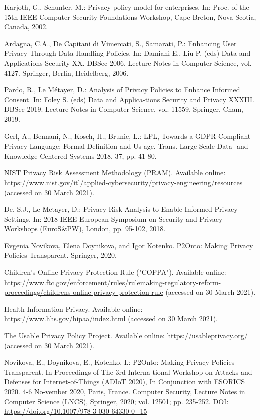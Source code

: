 \documentclass[../main]{subfiles}
\begin{document}
\begin{english}
\begin{biblenum}
     Karjoth, G., Schunter, M.: Privacy policy model for enterprises. In: Proc. of the 15th IEEE Computer Security Foundations Workshop, Cape Breton, Nova Scotia, Canada, 2002. 
    
     Ardagna, C.A., De Capitani di Vimercati, S., Samarati, P.: Enhancing User Privacy Through Data Handling Policies. In: Damiani E., Liu P. (eds) Data and Applications Security XX. DBSec 2006. Lecture Notes in Computer Science, vol. 4127. Springer, Berlin, Heidelberg, 2006. 

     Pardo, R., Le Métayer, D.: Analysis of Privacy Policies to Enhance Informed Consent. In: Foley S. (eds) Data and Applica-tions Security and Privacy XXXIII. DBSec 2019. Lecture Notes in Computer Science, vol. 11559. Springer, Cham, 2019. 

     Gerl, A., Bennani, N., Kosch, H., Brunie, L.: LPL, Towards a GDPR-Compliant Privacy Language: Formal Definition and Us-age. Trans. Large-Scale Data- and Knowledge-Centered Systems 2018, 37, pp. 41-80. 

     NIST Privacy Risk Assessment Methodology (PRAM). Available online: \url{https://www.nist.gov/itl/applied-cybersecurity/privacy-engineering/resources} (accessed on 30 March 2021).

     De, S.J., Le Metayer, D.: Privacy Risk Analysis to Enable Informed Privacy Settings. In: 2018 IEEE European Symposium on Security and Privacy Workshops (EuroS\&PW), London, pp. 95-102, 2018. 

     Evgenia Novikova, Elena Doynikova, and Igor Kotenko. P2Onto: Making Privacy Policies Transparent. Springer, 2020.

     Children's Online Privacy Protection Rule ("COPPA"). Available online: \url{https://www.ftc.gov/enforcement/rules/rulemaking-regulatory-reform-proceedings/childrens-online-privacy-protection-rule} (accessed on 30 March 2021). 

     Health Information Privacy. Available online: \url{https://www.hhs.gov/hipaa/index.html} (accessed on 30 March 2021).

     The Usable Privacy Policy Project. Available online: \url{https://usableprivacy.org/} (accessed on 30 March 2021).

     Novikova, E., Doynikova, E., Kotenko, I.: P2Onto: Making Privacy Policies Transparent. In Proceedings of The 3rd Interna-tional Workshop on Attacks and Defenses for Internet-of-Things (ADIoT 2020), In Conjunction with ESORICS 2020. 4-6 No-vember 2020, Paris, France. Computer Security, Lecture Notes in Computer Science (LNCS), Springer, 2020; vol. 12501; pp. 235-252. DOI: \url{https://doi.org/10.1007/978-3-030-64330-0_15}


\end{biblenum}
\end{english}
\end{document}
